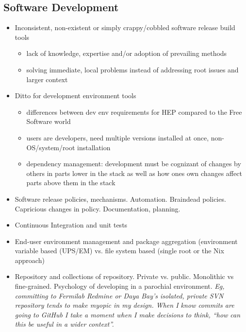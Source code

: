 \subsection{Software Development}

\begin{itemize}
\item Inconsistent, non-existent or simply crappy/cobbled software release build tools
  \begin{itemize}
  \item lack of knowledge, expertise and/or adoption of prevailing methods
  \item solving immediate, local problems instead of addressing root issues and larger context
  \end{itemize}
\item Ditto for development environment tools
  \begin{itemize}
  \item differences between dev env requirements for HEP compared to the Free Software world
  \item users are developers, need multiple versions installed at once, non-OS/system/root installation
  \item dependency management: development must be cognizant of changes by others in parts lower in the stack as well as how ones own changes affect parts above them in the stack
  \end{itemize}
\item Software release policies, mechanisms.  Automation.  Braindead policies.  Capricious changes in policy.  Documentation, planning.
\item Continuous Integration and unit tests
\item End-user environment management and package aggregation (environment variable based (UPS/EM) vs. file system based (single root or the Nix approach)
\item Repository and collections of repository.  Private vs. public.  Monolithic vs fine-grained.  Psychology of developing in a parochial environment.  \textit{Eg, committing to Fermilab Redmine or Daya Bay's  isolated, private SVN repository tends to make myopic in my design.  When I know commits are going to GitHub I take a moment when I make decisions to think, ``how can this be useful in a wider context''.}
\end{itemize}
